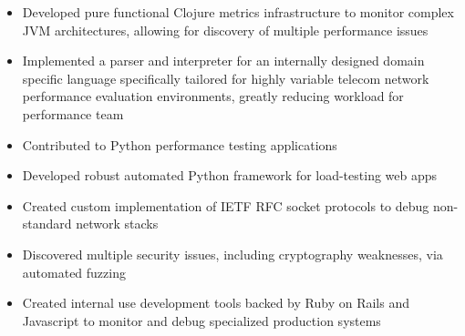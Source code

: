 \documentclass[10pt,a4paper]{altacv}
\newenvironment{tightitemize} %
{\vspace{-\topsep}\begin{itemize}\itemsep1pt \parskip0pt \parsep0pt}
{\end{itemize}\vspace{-\topsep}}
\begin{document}
\vspace{\topsep} %
\begin{tightitemize}
    \item Developed pure functional Clojure metrics infrastructure to monitor 
        complex JVM architectures, allowing for discovery of multiple 
        performance issues
    \item Implemented a parser and interpreter for an internally designed domain 
        specific language specifically tailored for highly variable telecom 
        network performance evaluation environments, greatly reducing workload 
        for performance team
    \item Contributed to Python performance testing applications
\end{tightitemize}

\smallskip
\divider

\vspace{\topsep} %
\begin{tightitemize}
    \item Developed robust automated Python framework for load-testing web apps
    \item Created custom implementation of IETF RFC socket protocols to debug 
        non-standard network stacks
    \item Discovered multiple security issues, including cryptography 
        weaknesses, via automated fuzzing
\end{tightitemize}

\smallskip
\divider

\vspace{\topsep} %
\begin{tightitemize}
\item Created internal use development tools backed by Ruby on Rails 
    and Javascript to monitor and debug specialized production systems
\end{tightitemize}
\end{document}

